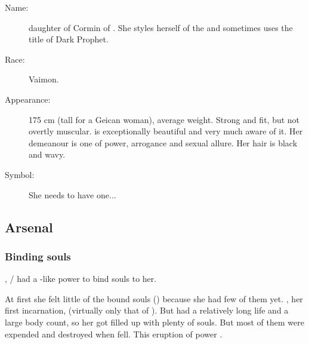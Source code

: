 \begin{description}
  \item[Name:] {\Belzir} daughter of {Cormin} of \ClanGeican. She styles herself \Calipha of the \VaimonCaliphate and sometimes uses the title of Dark Prophet. 
  \item[Race:] Vaimon. 
  \item[Appearance:] 175 cm (tall for a Geican woman), average weight. Strong and fit, but not overtly muscular. \Belzir{} is exceptionally beautiful and very much aware of it. Her demeanour is one of power, arrogance and sexual allure. Her hair is black and wavy. 
  \item[Symbol:] She needs to have one... 
\end{description}









\subsection{Arsenal}





\subsubsection{Binding souls}
\index{\carcer!\Belzir}
, \Shiaraid{}/\Belzir{} had a \sephirah-like power to bind souls to her. 

At first she felt little of the bound souls () because she had few of them yet. 
\Delphine{}, her first incarnation,  (virtually only that of \Eryal). 
But \Belzir{} had a relatively long life and a large body count, so her \carcer{} got filled up with plenty of souls. 
But most of them were expended and destroyed when \Belzir{} fell. 
This eruption of power . 









